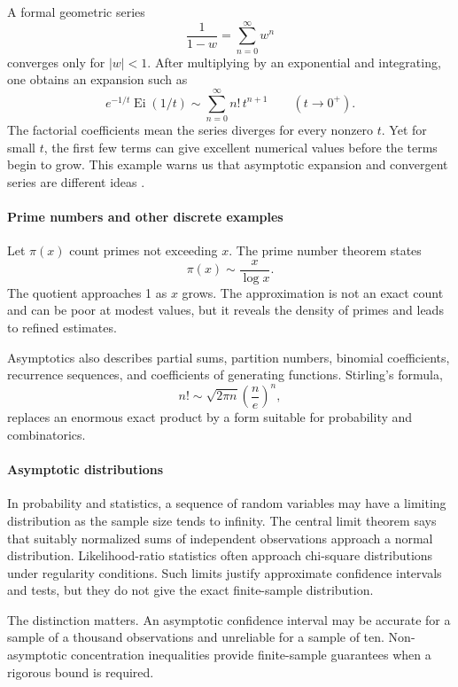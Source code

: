 A formal geometric series
\[
 \frac1{1-w}=\sum_{n=0}^{\infty}w^n
\]
converges only for $|w|<1$. After multiplying by an exponential and integrating, one obtains an expansion such as
\[
 e^{-1/t}\operatorname{Ei}(1/t)\sim\sum_{n=0}^{\infty}n!\,t^{n+1}
\qquad(t\to0^+).
\]
The factorial coefficients mean the series diverges for every nonzero $t$. Yet for small $t$, the first few terms can give excellent numerical values before the terms begin to grow. This example warns us that asymptotic expansion and convergent series are different ideas \cite{asymptotic_theory_ref4}.

\paragraph{Prime numbers and other discrete examples}

Let $\pi(x)$ count primes not exceeding $x$. The prime number theorem states
\[
 \pi(x)\sim\frac{x}{\log x}.
\]
The quotient approaches 1 as $x$ grows. The approximation is not an exact count and can be poor at modest values, but it reveals the density of primes and leads to refined estimates.

Asymptotics also describes partial sums, partition numbers, binomial coefficients, recurrence sequences, and coefficients of generating functions. Stirling's formula,
\[
 n!\sim\sqrt{2\pi n}\left(\frac ne\right)^n,
\]
replaces an enormous exact product by a form suitable for probability and combinatorics.

\paragraph{Asymptotic distributions}

In probability and statistics, a sequence of random variables may have a limiting distribution as the sample size tends to infinity. The central limit theorem says that suitably normalized sums of independent observations approach a normal distribution. Likelihood-ratio statistics often approach chi-square distributions under regularity conditions. Such limits justify approximate confidence intervals and tests, but they do not give the exact finite-sample distribution.

The distinction matters. An asymptotic confidence interval may be accurate for a sample of a thousand observations and unreliable for a sample of ten. Non-asymptotic concentration inequalities provide finite-sample guarantees when a rigorous bound is required.

